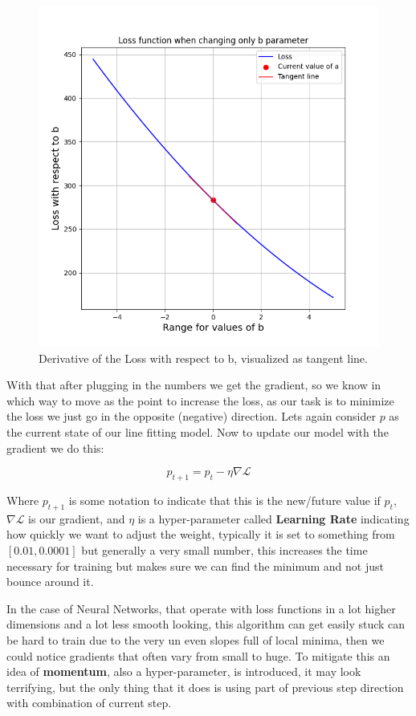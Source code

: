 \documentclass{article}
\begin{document}
\begin{figure}[h]
\begin{minipage}{0.4\textwidth}
        \includegraphics[width=\linewidth]{../images/myplot10.png}
        \caption{Derivative of the Loss with respect to b, visualized as tangent line.}
    \end{minipage}
\end{figure}

With that after plugging in the numbers we get the gradient, so we know in which way to move as the point to increase the loss, as our task is to minimize the loss we just go in the opposite (negative) direction. Lets again consider $p$ as the current state of our line fitting model. Now to update our model with the gradient we do this:

\begin{equation}
    p_{t+1} = p_t - \eta\nabla\mathcal L
\end{equation}

Where $p_{t+1}$ is some notation to indicate that this is the new/future value if $p_t$, $\nabla\mathcal L$ is our gradient, and $\eta$ is a hyper-parameter called \textbf{Learning Rate} indicating how quickly we want to adjust the weight, typically it is set to something from $\left[0.01, 0.0001\right]$ but generally a very small number, this increases the time necessary for training but makes sure we can find the minimum and not just bounce around it.

In the case of Neural Networks, that operate with loss functions in a lot higher dimensions and a lot less smooth looking, this algorithm can get easily stuck can be hard to train due to the very un even slopes full of local minima, then we could notice gradients that often vary from small to huge. To mitigate this an idea of \textbf{momentum}, also a hyper-parameter, is introduced, it may look terrifying, but the only thing that it does is using part of previous step direction with combination of current step.
\end{document}
